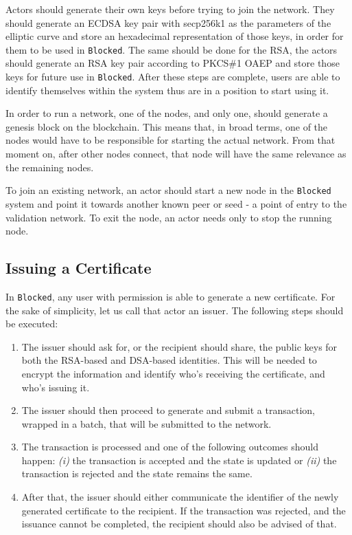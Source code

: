 Actors should generate their own keys before trying to join the network. They should generate an ECDSA key pair with secp256k1 as the parameters of the elliptic curve and store an hexadecimal representation of those keys, in order for them to be used in \texttt{Blocked}. The same should be done for the RSA, the actors should generate an RSA key pair according to PKCS\#1 OAEP and store those keys for future use in \texttt{Blocked}. After these steps are complete, users are able to identify themselves within the system thus are in a position to start using it.

In order to run a network, one of the nodes, and only one, should generate a genesis block on the blockchain. This means that, in broad terms, one of the nodes would have to be responsible for starting the actual network. From that moment on, after other nodes connect, that node will have the same relevance as the remaining nodes.

To join an existing network, an actor should start a new node in the \texttt{Blocked} system and point it towards another known peer or seed - a point of entry to the validation network. To exit the node, an actor needs only to stop the running node.

\subsection{Issuing a Certificate}

In \texttt{Blocked}, any user with permission is able to generate a new certificate. For the sake of simplicity, let us call that actor an issuer. The following steps should be executed:

\begin{enumerate}
	\item The issuer should ask for, or the recipient should share, the public keys for both the RSA-based and DSA-based identities. This will be needed to encrypt the information and identify who's receiving the certificate, and who's issuing it.
	\item The issuer should then proceed to generate and submit a transaction, wrapped in a batch, that will be submitted to the network.
	\item The transaction is processed and one of the following outcomes should happen: \emph{(i)} the transaction is accepted and the state is updated or \emph{(ii)} the transaction is rejected and the state remains the same.
	\item After that, the issuer should either communicate the identifier of the newly generated certificate to the recipient. If the transaction was rejected, and the issuance cannot be completed, the recipient should also be advised of that.
\end{enumerate}

